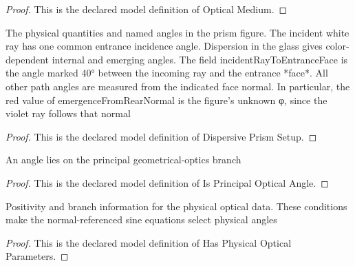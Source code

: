 \begin{proof}
  This is the declared model definition of Optical Medium.
\end{proof}
\begin{definition}
  \label{def:physics:phyx-mini-0073:phyxminiproblems-problemphyxmini0073-dispersiveprismsetup}
  The physical quantities and named angles in the prism figure. The incident white ray has one common entrance incidence angle. Dispersion in the glass gives color-dependent internal and emerging angles. The field incidentRayToEntranceFace is the angle marked 40° between the incoming ray and the entrance *face*. All other path angles are measured from the indicated face normal. In particular, the red value of emergenceFromRearNormal is the figure's unknown φ, since the violet ray follows that normal
\end{definition}
\begin{proof}
  This is the declared model definition of Dispersive Prism Setup.
\end{proof}
\begin{definition}
  \label{def:physics:phyx-mini-0073:phyxminiproblems-problemphyxmini0073-isprincipalopticalangle}
  An angle lies on the principal geometrical-optics branch
\end{definition}
\begin{proof}
  This is the declared model definition of Is Principal Optical Angle.
\end{proof}
\begin{definition}
  \label{def:physics:phyx-mini-0073:phyxminiproblems-problemphyxmini0073-hasphysicalopticalparameters}
  Positivity and branch information for the physical optical data. These conditions make the normal-referenced sine equations select physical angles
\end{definition}
\begin{proof}
  This is the declared model definition of Has Physical Optical Parameters.
\end{proof}
